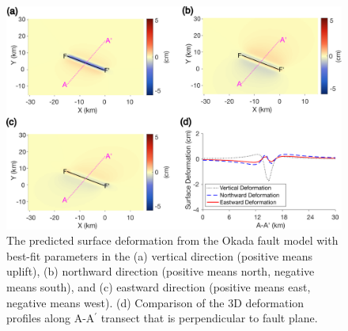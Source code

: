 \documentclass[draft,grl]{agutexSI2019}
\begin{document}
\begin{article}
\begin{figure}
	\centering
	\includegraphics[width=\textwidth]{figures/supplement/figureS8-fault-predicted-xyz.pdf}
	\caption{The predicted surface deformation from the Okada fault model with best-fit parameters in the (a) vertical direction (positive means uplift), (b) northward direction (positive means north, negative means south), and (c) eastward direction (positive means east, negative means west). (d) Comparison of the 3D deformation profiles along A-A$^{'} $ transect that is perpendicular to fault plane.
	}
	\label{fig:fault-model-xyz}
\end{figure}


\end{article}
\end{document}

